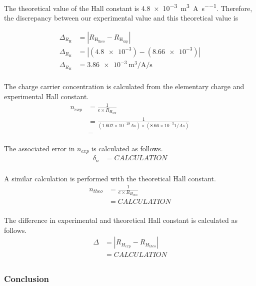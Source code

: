 \documentclass[a4paper]{article}
\begin{document}
\qq The theoretical value of the Hall constant is
\SI{4.8e-3}{\cubic\meter\per\ampere\per\second}. Therefore, the discrepancy
between our experimental value and this theoretical value is

\begin{align*}
  \Delta_{R_{\text{H}}} &= | R_{\text{H}_{\text{theo}}} - R_{\text{H}_{\text{exp}}} | \\
  \Delta_{R_{\text{H}}} &= | (\num{4.8e-3}) - (\num{8.66e-3}) | \\
  \Delta_{R_{\text{H}}} &= \SI{3.86e-3}{\cubic\meter\per\ampere\per\second} \\
\end{align*}


\qq The charge carrier concentration is calculated from the elementary
charge and experimental Hall constant.
\begin{align*}
n_{exp} &= \frac{1}{e \times R_{H_{exp}}} \\
	&= \frac{1}{(1.602 \times 10^{-19} As) \times (8.66 \times 10^{-3} 1/As)} \\
	&=
\end{align*}

The associated error in $n_{exp}$ is calculated as follows.
\begin{align*}
\delta_n &= CALCULATION \\
\end{align*}

A similar calculation is performed with the theoretical Hall constant.
\begin{align*}
n_{theo} &= \frac{1}{e \times R_{H_{theo}}} \\
	&= CALCULATION \\
\end{align*}

The difference in experimental and theoretical Hall constant is calculated as follows.
\begin{align*}
\Delta &= | R_{H_{exp}} - R_{H_{theo}} | \\
	   &= CALCULATION \\
\end{align*}


\subsubsection{Conclusion}
\end{document}

